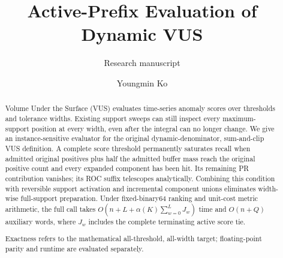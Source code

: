 \documentclass[sigconf,nonacm]{acmart}
\begin{document}
\title{Active-Prefix Evaluation of Dynamic VUS}
\subtitle{Research manuscript}
\author{Youngmin Ko}
\begin{abstract}
Volume Under the Surface (VUS) evaluates time-series anomaly scores over
thresholds and tolerance widths. Existing support sweeps can still inspect
every maximum-support position at every width, even after the integral can
no longer change. We give an instance-sensitive evaluator for the original
dynamic-denominator, sum-and-clip VUS definition. A complete score threshold
permanently saturates recall when admitted original positives plus half the
admitted buffer mass reach the original positive count and every expanded
component has been hit. Its remaining PR contribution vanishes; its ROC
suffix telescopes analytically. Combining this condition with reversible
support activation and incremental component unions eliminates width-wise
full-support preparation. Under fixed-binary64 ranking and unit-cost metric
arithmetic, the full call takes
$O(n+L+\alpha(K)\sum_{w=0}^{L}J_w)$ time and $O(n+Q)$ auxiliary words,
where $J_w$ includes the complete terminating active score tie.

Exactness refers to the mathematical all-threshold, all-width target;
floating-point parity and runtime are evaluated separately.
\end{abstract}
\maketitle
\vldbtopmatter



\end{document}
